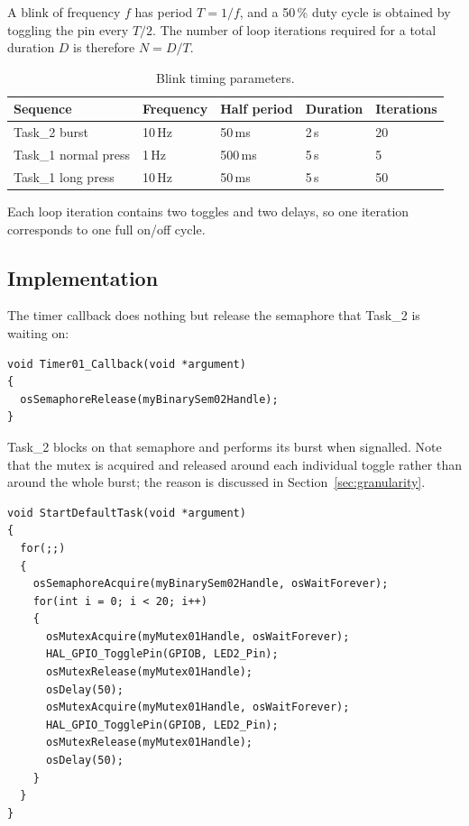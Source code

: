 \documentclass[11pt,a4paper]{article}
\begin{document}
A blink of frequency $f$ has period $T = 1/f$, and a 50\,\% duty cycle is
obtained by toggling the pin every $T/2$. The number of loop iterations
required for a total duration $D$ is therefore $N = D/T$.

\begin{table}[h]
\centering
\begin{tabular}{lllll}
\toprule
Sequence & Frequency & Half period & Duration & Iterations \\
\midrule
Task\_2 burst          & 10\,Hz & 50\,ms  & 2\,s & 20 \\
Task\_1 normal press   & 1\,Hz  & 500\,ms & 5\,s & 5 \\
Task\_1 long press     & 10\,Hz & 50\,ms  & 5\,s & 50 \\
\bottomrule
\end{tabular}
\caption{Blink timing parameters.}
\end{table}

Each loop iteration contains two toggles and two delays, so one iteration
corresponds to one full on/off cycle.

\subsection{Implementation}

The timer callback does nothing but release the semaphore that Task\_2 is
waiting on:

\begin{lstlisting}[caption={Periodic timer callback signalling Task\_2.}]
void Timer01_Callback(void *argument)
{
  osSemaphoreRelease(myBinarySem02Handle);
}
\end{lstlisting}

Task\_2 blocks on that semaphore and performs its burst when signalled. Note
that the mutex is acquired and released around each individual toggle rather
than around the whole burst; the reason is discussed in
Section~\ref{sec:granularity}.

\begin{lstlisting}[caption={Task\_2: 2\,s at 10\,Hz, triggered by the timer.}]
void StartDefaultTask(void *argument)
{
  for(;;)
  {
    osSemaphoreAcquire(myBinarySem02Handle, osWaitForever);
    for(int i = 0; i < 20; i++)
    {
      osMutexAcquire(myMutex01Handle, osWaitForever);
      HAL_GPIO_TogglePin(GPIOB, LED2_Pin);
      osMutexRelease(myMutex01Handle);
      osDelay(50);
      osMutexAcquire(myMutex01Handle, osWaitForever);
      HAL_GPIO_TogglePin(GPIOB, LED2_Pin);
      osMutexRelease(myMutex01Handle);
      osDelay(50);
    }
  }
}
\end{lstlisting}
\end{document}
